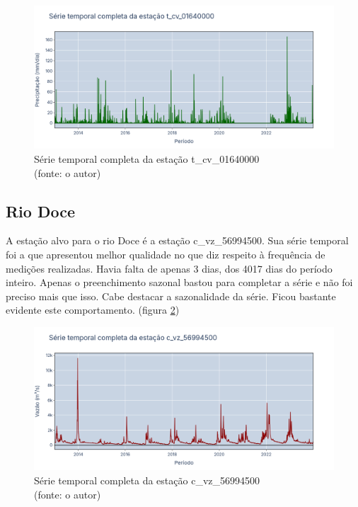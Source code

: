\begin{figure}[!h]
	\centering
	\includegraphics[scale=0.25]{Figuras/jequiti/jequitinhonhaSerieCompleta_t_cv_01640000.png}
	\caption{Série temporal completa da estação t\_cv\_01640000\\(fonte: o autor)}
	\label{fig:jequitinhonhaSerieCompleta_t_cv_01640000}
\end{figure}

\subsection{Rio Doce}

A estação alvo para o rio Doce é a estação c\_vz\_56994500. Sua série temporal foi a que apresentou melhor qualidade no que diz respeito à frequência de medições realizadas. Havia falta de apenas 3 dias, dos 4017 dias do período inteiro. Apenas o preenchimento sazonal bastou para completar a série e não foi preciso mais que isso. Cabe destacar a sazonalidade da série. Ficou bastante evidente este comportamento. (figura \ref{fig:doceSerieCompleta_c_vz_56994500})

\begin{figure}[!h]
	\centering
	\includegraphics[scale=0.25]{Figuras/rio_doce/doceSerieCompleta_c_vz_56994500.png}
	\caption{Série temporal completa da estação c\_vz\_56994500\\(fonte: o autor)}
	\label{fig:doceSerieCompleta_c_vz_56994500}
\end{figure}


